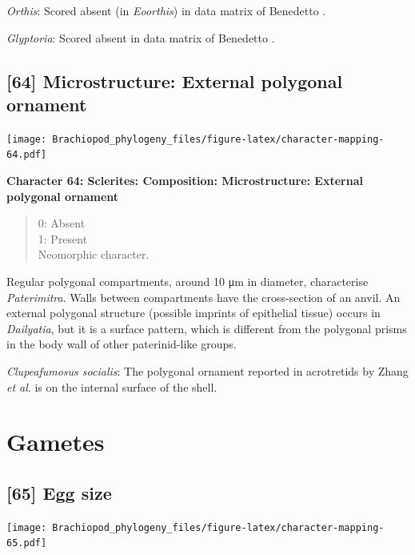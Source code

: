 \documentclass[openany]{book}
\theoremstyle{definition}
\theoremstyle{definition}
\theoremstyle{definition}
\theoremstyle{remark}
\begin{document}
\emph{Orthis}: Scored absent (in \emph{Eoorthis}) in data matrix of
Benedetto \citeyearpar{Benedetto2009iChaniella}.

\emph{Glyptoria}: Scored absent in data matrix of Benedetto
\citeyearpar{Benedetto2009iChaniella}.

\hypertarget{microstructure-external-polygonal-ornament}{%
\subsection*{{[}64{]} Microstructure: External polygonal
ornament}\label{microstructure-external-polygonal-ornament}}

\texttt{[image: Brachiopod\_phylogeny\_files/figure-latex/character-mapping-64.pdf]}

\textbf{Character 64: Sclerites: Composition: Microstructure: External
polygonal ornament}

\begin{quote}
0: Absent\\
1: Present\\
Neomorphic character.
\end{quote}

Regular polygonal compartments, around 10 μm in diameter, characterise
\emph{Paterimitra}. Walls between compartments have the cross-section of
an anvil. An external polygonal structure (possible imprints of
epithelial tissue) occurs in \emph{Dailyatia}, but it is a surface
pattern, which is different from the polygonal prisms in the body wall
of other paterinid-like groups.

\emph{Clupeafumosus socialis}: The polygonal ornament reported in
acrotretids by Zhang \emph{et al}. \citeyearpar{Zhang2016Epithelialcell}
is on the internal surface of the shell.

\hypertarget{gametes}{%
\section{Gametes}\label{gametes}}

\hypertarget{egg-size}{%
\subsection*{{[}65{]} Egg size}\label{egg-size}}

\texttt{[image: Brachiopod\_phylogeny\_files/figure-latex/character-mapping-65.pdf]}
\end{document}
